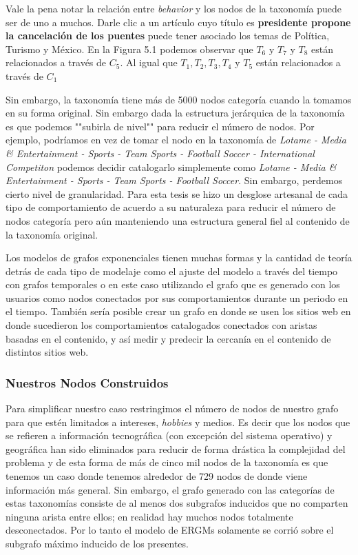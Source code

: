 Vale la pena notar la relación entre \textit{behavior} y los nodos de la taxonomía puede ser de uno a muchos. Darle clic a un artículo cuyo título es \textbf{presidente propone la cancelación de los puentes} puede tener asociado los temas de Política, Turismo y México. En la Figura 5.1 podemos observar que $T_6$ y $T_7$ y $T_{8}$  están relacionados a través de $C_5$. Al igual que $T_1, T_2, T_3,T_4$ y $T_5$ están relacionados a través de $C_1$


Sin embargo, la taxonomía tiene más de 5000 nodos categoría cuando la tomamos en su forma original. Sin embargo dada la estructura jerárquica de la taxonomía es que podemos ""subirla de nivel"" para reducir el número de nodos. Por ejemplo, podríamos en vez de tomar el nodo en la taxonomía de \textit{Lotame - Media & Entertainment - Sports - Team Sports - Football Soccer - International Competiton} podemos decidir catalogarlo simplemente como \textit{Lotame - Media & Entertainment - Sports - Team Sports - Football Soccer}. Sin embargo, perdemos cierto nivel de granularidad. Para esta tesis se hizo un desglose artesanal de cada tipo de comportamiento de acuerdo a su naturaleza para reducir el número de nodos categoría pero aún manteniendo una estructura general fiel al contenido de la taxonomía original.

Los modelos de grafos exponenciales tienen muchas formas y la cantidad de teoría detrás de cada tipo de modelaje como el ajuste del modelo a través del tiempo con grafos temporales o en este caso utilizando el grafo que es generado con los usuarios como nodos conectados por sus comportamientos durante un periodo en el tiempo. También sería posible crear un grafo en donde se usen los sitios web en donde sucedieron los comportamientos catalogados conectados con aristas basadas en el contenido, y así medir y predecir la cercanía en el contenido de distintos sitios web. 

\subsubsection{Nuestros Nodos Construidos}

Para simplificar nuestro caso restringimos el número de nodos de nuestro grafo para que estén limitados a intereses, \textit{hobbies} y medios. Es decir que los nodos que se refieren a información tecnográfica (con excepción del sistema operativo) y geográfica han sido eliminados para reducir de forma drástica la complejidad del problema y de esta forma de más de cinco mil nodos de la taxonomía es que tenemos un caso donde tenemos alrededor de 729 nodos de donde viene información más general. Sin embargo, el grafo generado con las categorías de estas taxonomías consiste de al menos dos subgrafos inducidos que no comparten ninguna arista entre ellos; en realidad hay muchos nodos totalmente desconectados. Por lo tanto el modelo de ERGMs solamente se corrió sobre el subgrafo máximo inducido de los presentes.


